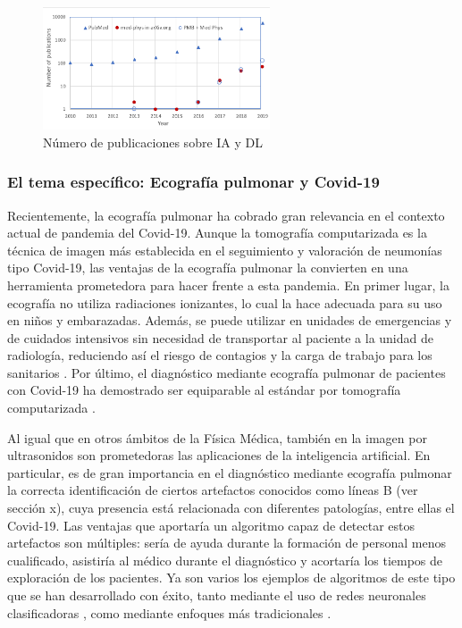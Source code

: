 \documentclass[11pt]{article} %
\begin{document}
	\begin{figure}
	\centering
	\includegraphics[width=0.6\textwidth]{figuras/DL_papers.png}	
	\caption{Número de publicaciones sobre IA y DL \cite{shen}}	
	\end{figure}
	
	
	 
\subsubsection{El tema específico: Ecografía pulmonar y Covid-19}
	Recientemente, la ecografía pulmonar ha cobrado gran relevancia en el contexto actual de pandemia del Covid-19. Aunque la tomografía computarizada es la técnica de imagen más establecida en el seguimiento y valoración de neumonías tipo Covid-19, las ventajas de la ecografía pulmonar la convierten en una herramienta prometedora para hacer frente a esta pandemia. En primer lugar, la ecografía no utiliza radiaciones ionizantes, lo cual la hace adecuada para su uso en niños y embarazadas. Además, se puede utilizar en unidades de emergencias y de cuidados intensivos sin necesidad de transportar al paciente a la unidad de radiología, reduciendo así el riesgo de contagios y la carga de trabajo para los sanitarios \cite{allinovi}. Por último, el diagnóstico mediante ecografía pulmonar de pacientes con Covid-19 ha demostrado ser equiparable al estándar por tomografía computarizada \cite{ottaviani}.
	
	Al igual que en otros ámbitos de la Física Médica, también en la imagen por ultrasonidos son prometedoras las aplicaciones de la inteligencia artificial. En particular, es de gran importancia en el diagnóstico mediante ecografía pulmonar la correcta identificación de ciertos artefactos conocidos como líneas B (ver sección x), cuya presencia está relacionada con diferentes patologías, entre ellas el Covid-19. Las ventajas que aportaría un algoritmo capaz de detectar estos artefactos son múltiples: sería de ayuda durante la formación de personal menos cualificado, asistiría al médico durante el diagnóstico y acortaría los tiempos de exploración de los pacientes. Ya son varios los ejemplos de algoritmos de este tipo que se han desarrollado con éxito, tanto mediante el uso de redes neuronales clasificadoras \cite{vanSloun}\cite{born2020pocovid}\cite{cristiana2020automated}\cite{roy2020deep}, como mediante enfoques más tradicionales \cite{brattain}\cite{moshavegh}.
\end{document}

